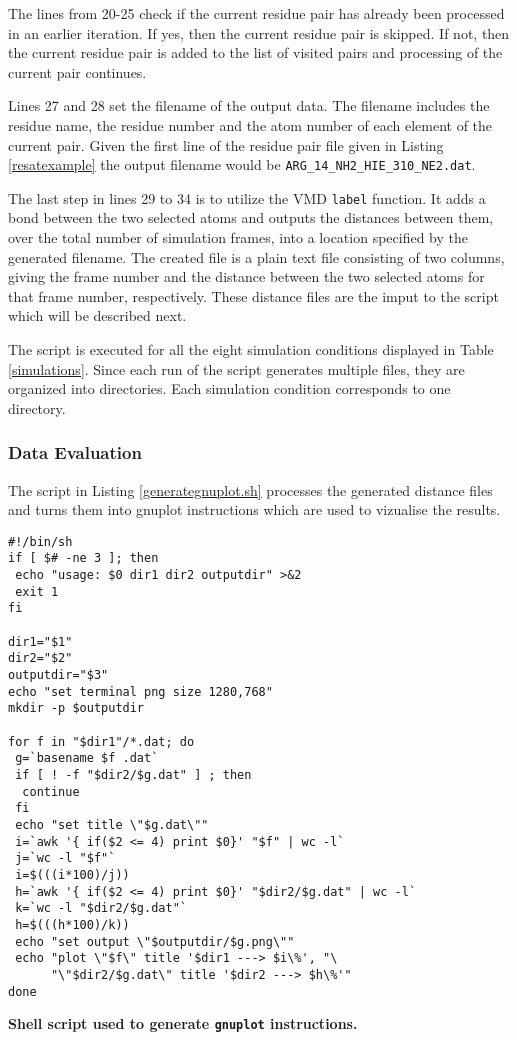 \documentclass[11pt,twocolumn]{article}
\newcommand{\4}{four {\AA}ngstroms}
\begin{document}
The lines from 20-25 check if the current residue pair has already been processed in an earlier iteration. If yes, then the current residue pair is skipped. If not, then the current residue pair is added to the list of visited pairs and processing of the current pair continues.  

Lines 27 and 28 set the filename of the output data. The filename includes the residue name, the residue number and the atom number of each element of the current pair. Given the first line of the residue pair file given in Listing \ref{resatexample} the output filename would be \texttt{ARG\_14\_NH2\_HIE\_310\_NE2.dat}.

The last step in lines 29 to 34 is to utilize the VMD \texttt{label} function. It adds a bond between the two selected atoms and outputs the distances between them, over the total number of simulation frames, into a location specified by the generated filename. The created file is a plain text file consisting of two columns, giving the frame number and the distance between the two selected atoms for that frame number, respectively. These distance files are the imput to the script which will be described next.

The script is executed for all the eight simulation conditions displayed in Table \ref{simulations}. Since each run of the script generates multiple files, they are organized into directories. Each simulation condition corresponds to one directory.

\subsubsection*{Data Evaluation}

The script in Listing \ref{generategnuplot.sh} processes the generated distance files and turns them into gnuplot instructions which are used to vizualise the results.

\begin{listing}
\begin{verbatim}
#!/bin/sh
if [ $# -ne 3 ]; then 
 echo "usage: $0 dir1 dir2 outputdir" >&2
 exit 1
fi

dir1="$1"
dir2="$2"
outputdir="$3"
echo "set terminal png size 1280,768" 
mkdir -p $outputdir

for f in "$dir1"/*.dat; do
 g=`basename $f .dat`
 if [ ! -f "$dir2/$g.dat" ] ; then 
  continue
 fi
 echo "set title \"$g.dat\""
 i=`awk '{ if($2 <= 4) print $0}' "$f" | wc -l`
 j=`wc -l "$f"`
 i=$(((i*100)/j))
 h=`awk '{ if($2 <= 4) print $0}' "$dir2/$g.dat" | wc -l`
 k=`wc -l "$dir2/$g.dat"`
 h=$(((h*100)/k))
 echo "set output \"$outputdir/$g.png\""
 echo "plot \"$f\" title '$dir1 ---> $i\%', "\
      "\"$dir2/$g.dat\" title '$dir2 ---> $h\%'"
done
\end{verbatim}
\caption{\textbf{Shell script used to generate \texttt{gnuplot} instructions.}}\label{generategnuplot.sh}
\end{listing}
\end{document}
